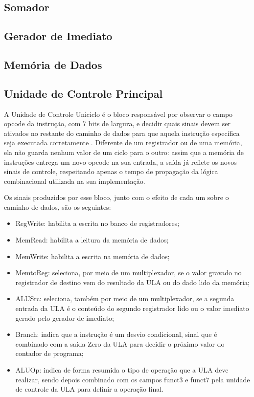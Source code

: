 \documentclass[conference]{IEEEtran}
\begin{document}
\subsection{Somador}

\subsection{Gerador de Imediato}

\subsection{Memória de Dados}

\subsection{Unidade de Controle Principal}
A Unidade de Controle Uniciclo é o bloco responsável por observar o campo opcode da instrução, com 7 bits
de largura, e decidir quais sinais devem ser ativados no restante do caminho de dados para que aquela
instrução específica seja executada corretamente \cite{patterson2020computer}. Diferente de um registrador
ou de uma memória, ela não guarda nenhum valor de um ciclo para o outro: assim que a memória de instruções
entrega um novo opcode na sua entrada, a saída já reflete os novos sinais de controle, respeitando apenas
o tempo de propagação da lógica combinacional utilizada na sua implementação.

Os sinais produzidos por esse bloco, junto com o efeito de cada um sobre o caminho de dados, são os
seguintes:

\begin{itemize}
    \item RegWrite: habilita a escrita no banco de registradores;
    \item MemRead: habilita a leitura da memória de dados;
    \item MemWrite: habilita a escrita na memória de dados;
    \item MemtoReg: seleciona, por meio de um multiplexador, se o valor gravado no registrador de destino
    vem do resultado da ULA ou do dado lido da memória;
    \item ALUSrc: seleciona, também por meio de um multiplexador, se a segunda entrada da ULA é o conteúdo
    do segundo registrador lido ou o valor imediato gerado pelo gerador de imediato;
    \item Branch: indica que a instrução é um desvio condicional, sinal que é combinado com a saída Zero
    da ULA para decidir o próximo valor do contador de programa;
    \item ALUOp: indica de forma resumida o tipo de operação que a ULA deve realizar, sendo depois
    combinado com os campos funct3 e funct7 pela unidade de controle da ULA para definir a operação final.
\end{itemize}
\end{document}
